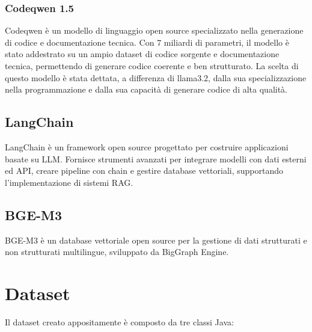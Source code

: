 \documentclass[12pt,a4paper,openright,twoside]{book}
\begin{document}
\subsubsection{Codeqwen 1.5}
Codeqwen \cite{codeqwen1.5} è un modello di linguaggio open source specializzato nella generazione di codice e documentazione tecnica.  
Con 7 miliardi di parametri, il modello è stato addestrato su un ampio dataset di codice sorgente e documentazione tecnica, permettendo di generare codice coerente e ben strutturato.
La scelta di questo modello è stata dettata, a differenza di llama3.2, dalla sua specializzazione nella programmazione e dalla sua capacità di generare codice di alta qualità. 

\subsection{LangChain}
LangChain \cite{langchain} è un framework open source progettato per costruire applicazioni basate su LLM.
Fornisce strumenti avanzati per integrare modelli con dati esterni ed API, creare pipeline con chain
e gestire database vettoriali, supportando l'implementazione di sistemi RAG.

\subsection{BGE-M3}
BGE-M3 \cite{bge-m3} è un database vettoriale open source per la gestione di dati strutturati e non strutturati multilingue, sviluppato da BigGraph Engine.

\section{Dataset}
Il dataset creato appositamente è composto da tre classi Java:
\end{document}
